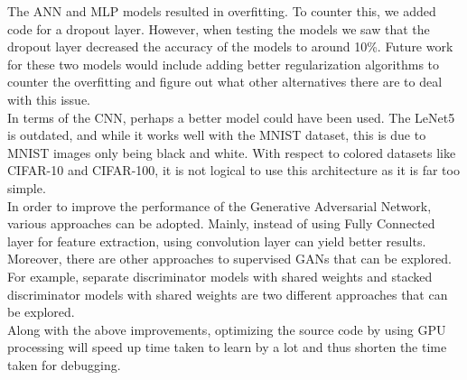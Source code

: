 The ANN and MLP models resulted in overfitting. To counter this, we added code for a dropout layer. However, when testing the models we saw that the dropout layer decreased the accuracy of the models to around 10\%. Future work for these two models would include adding better regularization algorithms to counter the overfitting and figure out what other alternatives there are to deal with this issue.\\

\noindent In terms of the CNN, perhaps a better model could have been used. The LeNet5 is outdated, and while it works well with the MNIST dataset, this is due to MNIST images only being black and white. With respect to colored datasets like CIFAR-10 and CIFAR-100, it is not logical to use this architecture as it is far too simple.\\

\noindent In order to improve the performance of the Generative Adversarial Network, various approaches can be adopted. Mainly, instead of using Fully Connected layer for feature extraction, using convolution layer can yield better results. Moreover, there are other approaches to supervised GANs that can be explored. For example, separate discriminator models with shared weights and stacked discriminator models with shared weights are two different approaches that can be explored.\\ 

\noindent Along with the above improvements, optimizing the source code by using GPU processing will speed up time taken to learn by a lot and thus shorten the time taken for debugging. 